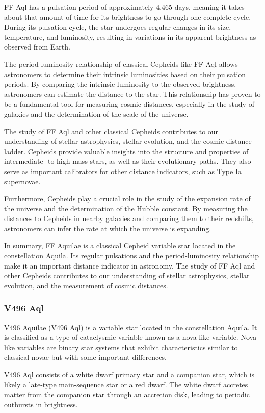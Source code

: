 FF Aql has a pulsation period of approximately 4.465 days, meaning it takes about that amount of time for its brightness to go through one complete cycle. During its pulsation cycle, the star undergoes regular changes in its size, temperature, and luminosity, resulting in variations in its apparent brightness as observed from Earth.

The period-luminosity relationship of classical Cepheids like FF Aql allows astronomers to determine their intrinsic luminosities based on their pulsation periods. By comparing the intrinsic luminosity to the observed brightness, astronomers can estimate the distance to the star. This relationship has proven to be a fundamental tool for measuring cosmic distances, especially in the study of galaxies and the determination of the scale of the universe.

The study of FF Aql and other classical Cepheids contributes to our understanding of stellar astrophysics, stellar evolution, and the cosmic distance ladder. Cepheids provide valuable insights into the structure and properties of intermediate- to high-mass stars, as well as their evolutionary paths. They also serve as important calibrators for other distance indicators, such as Type Ia supernovae.

Furthermore, Cepheids play a crucial role in the study of the expansion rate of the universe and the determination of the Hubble constant. By measuring the distances to Cepheids in nearby galaxies and comparing them to their redshifts, astronomers can infer the rate at which the universe is expanding.

In summary, FF Aquilae is a classical Cepheid variable star located in the constellation Aquila. Its regular pulsations and the period-luminosity relationship make it an important distance indicator in astronomy. The study of FF Aql and other Cepheids contributes to our understanding of stellar astrophysics, stellar evolution, and the measurement of cosmic distances.

\subsubsection*{ V496 Aql }
V496 Aquilae (V496 Aql) is a variable star located in the constellation Aquila. It is classified as a type of cataclysmic variable known as a nova-like variable. Nova-like variables are binary star systems that exhibit characteristics similar to classical novae but with some important differences.

V496 Aql consists of a white dwarf primary star and a companion star, which is likely a late-type main-sequence star or a red dwarf. The white dwarf accretes matter from the companion star through an accretion disk, leading to periodic outbursts in brightness.

